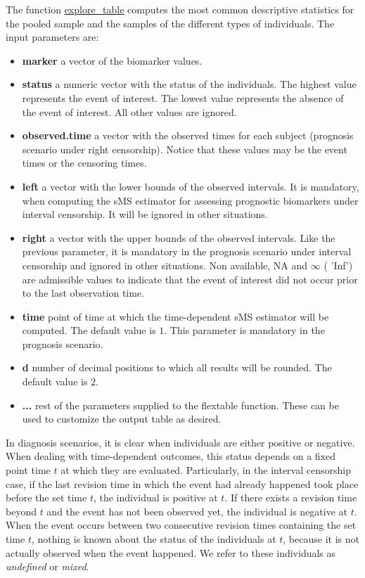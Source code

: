 The function \url{explore_table} computes the most common descriptive statistics for the pooled sample and the samples of the different types of individuals. The input parameters are:

\begin{itemize}
\item {\textbf{marker}} {a vector of the biomarker values.}
\item{\textbf{status}} {a numeric vector with the status of the individuals. The highest value represents the event of interest. The lowest value represents the absence of the event of interest. All other values are ignored.}
\item{\textbf{observed.time}} {a vector with the observed times for each subject (prognosis scenario under right censorship). Notice that these values may be the event times or the censoring times.}
\item{\textbf{left}} {a vector with the lower bounds of the observed intervals. It is mandatory, when computing the sMS estimator for assessing prognostic biomarkers under interval censorship. It will be ignored in other situations.}
\item{\textbf{right}} {a vector with the upper bounds of the observed intervals. Like the previous parameter, it is mandatory in the prognosis scenario under interval censorship and ignored in other situations. Non available, NA and $\infty$ ( 'Inf') are admissible values to indicate that the event of interest did not occur prior to the last observation time.}
\item{\textbf{time}} {point of time at which the time-dependent sMS estimator will be computed. The default value is $1$. This parameter is mandatory in the prognosis scenario.}
\item{\textbf{d}} {number of decimal positions to which all results will be rounded. The default value is $2$.}
\item{\textbf{...}} {rest of the parameters supplied to the flextable function. These can be used to customize the output table as desired.}
\end{itemize}

In diagnosis scenarios, it is clear when individuals are either positive or negative. When dealing with time-dependent outcomes, this status depends on a fixed point time $t$ at which they are evaluated. Particularly, in the interval censorship case, if the last revision time in which the event had already happened took place before the set time $t$, the individual is positive at $t$. If there exists a revision time beyond $t$ and the event has not been observed yet, the individual is negative at $t$. When the event occurs between two consecutive revision times containing the set time $t$, nothing is known about the status of the individuals at $t$, because it is not actually observed when the event happened. We refer to these individuals as {\it undefined} or {\it mixed}.

